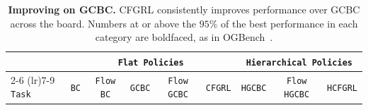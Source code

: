 \documentclass{article}
\begin{document}
\begin{table}[t!]
\centering
\caption{
\footnotesize
\textbf{Improving on GCBC.}
CFGRL consistently improves performance over GCBC across the board.
Numbers at or above the $95\%$ of the best performance in each category are boldfaced, as in OGBench~\citep{ogbench_park2025}.
}
\scalebox{0.73}
{
\begin{tabular}{lcccccccc}
\toprule
\multicolumn{1}{c}{} & \multicolumn{5}{c}{\texttt{Flat Policies}} & \multicolumn{3}{c}{\texttt{Hierarchical Policies}} \\
\cmidrule(lr){2-6} \cmidrule(lr){7-9}
\texttt{Task} & \texttt{BC} & \texttt{Flow BC} & \texttt{GCBC} & \texttt{Flow GCBC} & \texttt{\color{myred}CFGRL} & \texttt{HGCBC} & \texttt{Flow HGCBC} & \texttt{\color{myred}HCFGRL} \\
\midrule


\end{tabular}}
\end{table}
\end{document}
